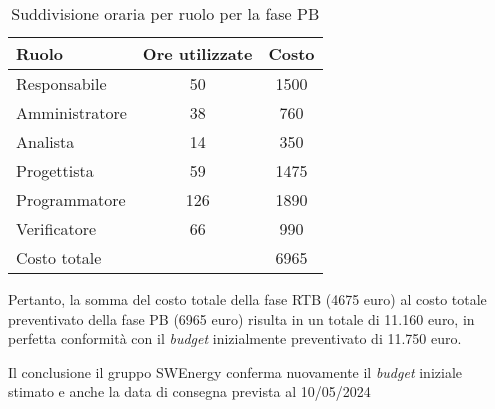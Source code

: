 \begin{table}[H]
	\centering
	\begin{tabular}{l|c|c}
		\textbf{Ruolo}         & \textbf{Ore utilizzate} 	& \textbf{Costo}\\
		\hline
		Responsabile            & 50                 & 1500     \\
		Amministratore          & 38                 & 760    \\
		Analista                & 14                 & 350     \\
		Progettista             & 59                 & 1475      \\
		Programmatore           & 126                & 1890      \\
		Verificatore            & 66                 & 990     \\
		\hline
		Costo totale			&                	 & 6965     \\
	\end{tabular}
	\caption{Suddivisione oraria per ruolo per la fase PB}  
\end{table}

Pertanto, la somma del costo totale della fase RTB (4675 euro) al costo totale preventivato della fase PB (6965 euro) risulta in un totale di 11.160 euro, 
in perfetta conformità con il \textit{budget} inizialmente preventivato di 11.750 euro.


Il conclusione il gruppo SWEnergy conferma nuovamente il \textit{budget} iniziale stimato e anche la data di consegna prevista al 10/05/2024



